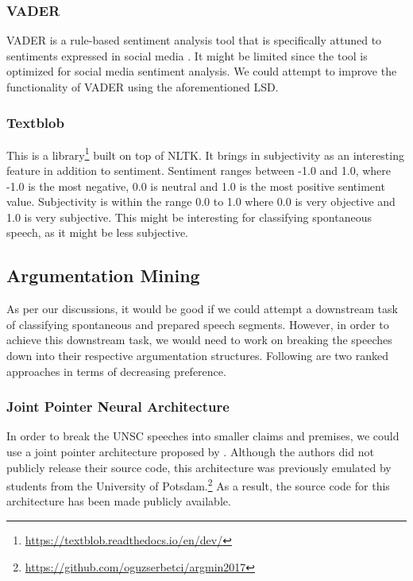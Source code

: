 \documentclass[12pt,a4paper]{article}
\begin{document}
\subsubsection{VADER} VADER is a rule-based sentiment analysis tool that is
specifically attuned to sentiments expressed in social media \citep{vader}. It
might be limited since the tool is optimized for social media sentiment
analysis. We could attempt to improve the functionality of VADER using the
aforementioned LSD.

\subsubsection{Textblob}

This is a library\footnote{\url{https://textblob.readthedocs.io/en/dev/}} built
on top of NLTK. It brings in subjectivity as an interesting feature in addition
to sentiment. Sentiment ranges between -1.0 and 1.0, where -1.0 is the most
negative, 0.0 is neutral and 1.0 is the most positive sentiment value.
Subjectivity is within the range 0.0 to 1.0 where 0.0 is very objective and 1.0
is very subjective. This might be interesting for classifying spontaneous
speech, as it might be less subjective.

\clearpage
\subsection{Argumentation Mining}

As per our discussions, it would be good if we could attempt a downstream task
of classifying spontaneous and prepared speech segments. However, in order to
achieve this downstream task, we would need to work on breaking the speeches
down into their respective argumentation structures. Following are two ranked
approaches in terms of decreasing preference.

\subsubsection{Joint Pointer Neural Architecture}

In order to break the UNSC speeches into smaller claims and premises, we could
use a joint pointer architecture proposed by \citet{potash2016heres}. Although
the authors did not publicly release their source code, this architecture was
previously emulated by students from the University of
Potsdam.\footnote{\url{https://github.com/oguzserbetci/argmin2017}} As a result,
the source code for this architecture has been made publicly available.
\end{document}
